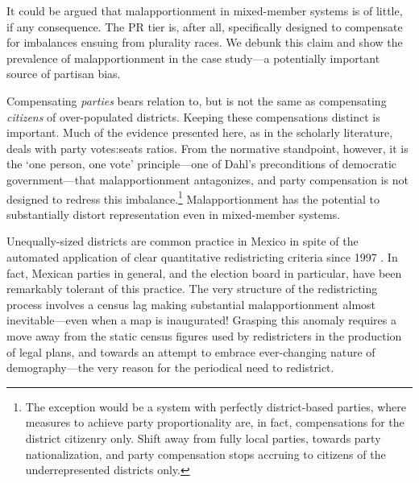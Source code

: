 \documentclass[letter,12pt]{article}
\begin{document}
It could be argued that malapportionment in mixed-member systems is of little, if any consequence. The PR tier is, after all, specifically designed to compensate for imbalances ensuing from plurality races. We debunk this claim and show the prevalence of malapportionment in the case study---a potentially important source of partisan bias. 

Compensating \emph{parties} bears relation to, but is not the same as compensating \emph{citizens} of over-populated districts. Keeping these compensations distinct is important. Much of the evidence presented here, as in the scholarly literature, deals with party votes:seats ratios. From the normative standpoint, however, it is the `one person, one vote' principle---one of Dahl's \citeyearpar{dahl.1972} preconditions of democratic government---that malapportionment antagonizes, and party compensation is not designed to redress this imbalance.\footnote{The exception would be a system with perfectly district-based parties, where measures to achieve party proportionality are, in fact, compensations for the district citizenry only. Shift away from fully local parties, towards party nationalization, and party compensation stops accruing to citizens of the underrepresented districts only.} Malapportionment has the potential to substantially distort representation even in mixed-member systems. 

Unequally-sized districts are common practice in Mexico in spite of the automated application of clear quantitative redistricting criteria since 1997 \citep{altman.magar.mcd.trelles2014apsa}. In fact, Mexican parties in general, and the election board in particular, have been remarkably tolerant of this practice. The very structure of the redistricting process involves a census lag making substantial malapportionment almost inevitable---even when a map is inaugurated! Grasping this anomaly requires a move away from the static census figures used by redistricters in the production of legal plans, and towards an attempt to embrace ever-changing nature of demography---the very reason for the periodical need to redistrict.
\end{document}

